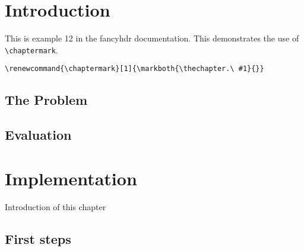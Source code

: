 \documentclass{book}
\renewcommand{\chaptermark}[1]{\markboth{\thechapter.\ #1}{}}
\begin{document}
\chapter{Introduction}

\begin{boxedminipage}{\textwidth}
This is example 12 in the fancyhdr documentation. 
This demonstrates the use of \verb|\chaptermark|.
\begin{verbatim}
\renewcommand{\chaptermark}[1]{\markboth{\thechapter.\ #1}{}}
\end{verbatim}
\end{boxedminipage}

\section{The Problem}
\label{sec:problem}

\lipsum[1]

\section{Evaluation}

\lipsum[2]

\chapter{Implementation}

Introduction of this chapter

\lipsum[3]

\section{First steps}
\label{sec:first-steps}

\lipsum
\end{document}
